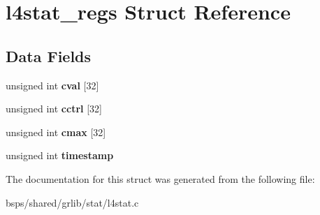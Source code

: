 \hypertarget{structl4stat__regs}{}\section{l4stat\+\_\+regs Struct Reference}
\label{structl4stat__regs}
\subsection*{Data Fields}
\begin{DoxyCompactItemize}
\item 
\mbox{\label{structl4stat__regs_a0d207fd9a108b010ba8db6c51fb09c78}} 
unsigned int {\bfseries cval} \mbox{[}32\mbox{]}
\item 
\mbox{\label{structl4stat__regs_a6f050622f40ae63851c6cd4d0e1ac064}} 
unsigned int {\bfseries cctrl} \mbox{[}32\mbox{]}
\item 
\mbox{\label{structl4stat__regs_ac79207aebcd11c0d637a2f31d55f6b89}} 
unsigned int {\bfseries cmax} \mbox{[}32\mbox{]}
\item 
\mbox{\label{structl4stat__regs_a77ab53159157e2b53234d980e8506230}} 
unsigned int {\bfseries timestamp}
\end{DoxyCompactItemize}


The documentation for this struct was generated from the following file\+:\begin{DoxyCompactItemize}
\item 
bsps/shared/grlib/stat/l4stat.\+c\end{DoxyCompactItemize}
